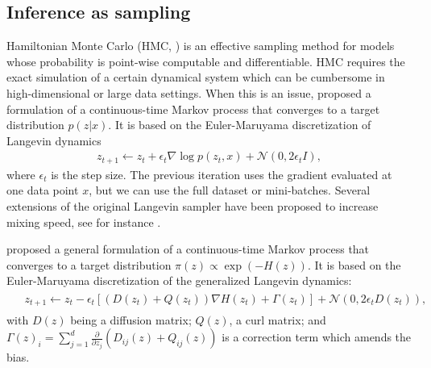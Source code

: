 \subsection{Inference as sampling}\label{sec:infassamp}

Hamiltonian Monte Carlo (HMC, \textcite{neal2011mcmc}) is an effective sampling method for models whose probability is point-wise computable and differentiable. %
HMC requires the exact simulation of a certain dynamical system which can be cumbersome in high-dimensional or large data settings. When this is an issue, \textcite{welling2011bayesian} proposed a formulation of a continuous-time Markov process that converges to a target distribution $p({z} | {x})$. It is based on the Euler-Maruyama discretization of Langevin dynamics
\begin{eqnarray}\label{eq:sgld}
{z}_{t+1} \leftarrow {z}_{t} + \epsilon_t \nabla \log p({z}_t,{x})  + \mathcal{N}({0}, 2\epsilon_t I),
\end{eqnarray}
where $\epsilon_t$ is the step size. The previous iteration uses the gradient evaluated at one data point ${x}$, but we can use the full dataset or mini-batches. Several extensions of the original Langevin sampler have been proposed to increase mixing speed, see for instance \parencite{li2016preconditioned,li2016high,li2019communication}.

\textcite{ma2015complete} proposed a general formulation of a continuous-time Markov process that converges to a target distribution $\pi({z}) \propto \exp (-H({z}))$. It is based on the Euler-Maruyama discretization of the generalized Langevin dynamics:
\begin{align}\label{eq:sgmcmc}
\begin{split}
&{z}_{t+1} \leftarrow {z}_{t}  -\epsilon_t \left[ ({D}({z}_t) + {Q}({z}_t)) \nabla H({z}_t) + {\Gamma}({z}_t) \right] + \mathcal{N}({0}, 2\epsilon_t {D}({z}_t)),
\end{split}
\end{align}
with ${D}({z})$ being a diffusion matrix; ${Q}({z})$, a curl matrix; and ${\Gamma}({z})_i = \sum_{j=1}^d \frac{\partial}{\partial {z}_j} ({D}_{ij}({z}) + {Q}_{ij}({z})) $ is a correction term which amends the bias.

